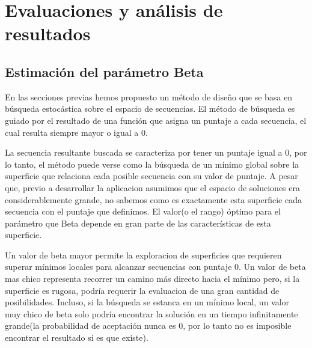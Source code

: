 \chapter{Evaluaciones y análisis de resultados}
\label{results}

\section{Estimación del parámetro Beta}

En las secciones previas hemos propuesto un método de diseño que se basa en búsqueda estocástica sobre el espacio de secuencias.
El método de búsqueda es guiado por el resultado de una función que asigna un puntaje a cada secuencia, el cual resulta siempre mayor o igual a 0.

La secuencia resultante buscada se caracteriza por tener un puntaje igual a 0, por lo tanto, el método puede verse como la búsqueda de un mínimo global sobre la superficie
que relaciona cada posible secuencia con su valor de puntaje.
A pesar que, previo a desarrollar la aplicacion asumimos que el espacio de soluciones era considerablemente grande, no sabemos como es exactamente esta superficie cada secuencia con el puntaje que definimos.
El valor(o el rango) óptimo para el parámetro que Beta depende en gran parte de las características de esta superficie.

Un valor de beta mayor permite la exploracion de superficies que requieren superar mínimos locales para alcanzar secuencias con puntaje 0.
Un valor de beta mas chico representa recorrer un camino más directo hacia el mínimo pero, si la superficie es rugosa, podría requerir la evaluacion de una gran cantidad de posibilidades.
Incluso, si la búsqueda se estanca en un mínimo local, un valor muy chico de beta solo podría encontrar la solución en un tiempo infinitamente grande(la probabilidad de aceptación nunca es 0, por lo tanto no es imposible encontrar el resultado si es que existe).

